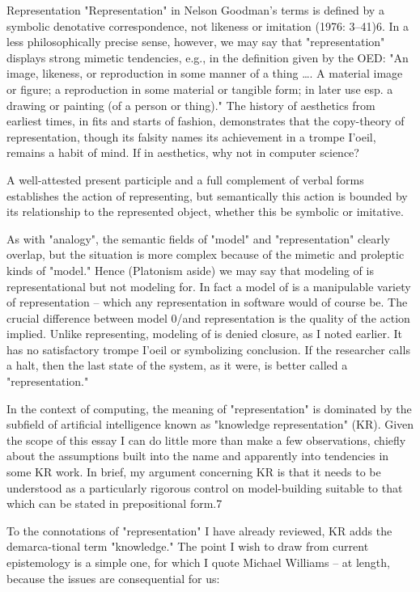 Representation
"Representation" in Nelson Goodman's terms is defined by a symbolic denotative correspondence, not likeness or imitation (1976: 3–41)6. In a less philosophically precise sense, however, we may say that "representation" displays strong mimetic tendencies, e.g., in the definition given by the OED: "An image, likeness, or reproduction in some manner of a thing …. A material image or figure; a reproduction in some material or tangible form; in later use esp. a drawing or painting (of a person or thing)." The history of aesthetics from earliest times, in fits and starts of fashion, demonstrates that the copy-theory of representation, though its falsity names its achievement in a trompe I'oeil, remains a habit of mind. If in aesthetics, why not in computer science?

A well-attested present participle and a full complement of verbal forms establishes the action of representing, but semantically this action is bounded by its relationship to the represented object, whether this be symbolic or imitative.

As with "analogy", the semantic fields of "model" and "representation" clearly overlap, but the situation is more complex because of the mimetic and proleptic kinds of "model." Hence (Platonism aside) we may say that modeling of is representational but not modeling for. In fact a model of is a manipulable variety of representation – which any representation in software would of course be. The crucial difference between model 0/and representation is the quality of the action implied. Unlike representing, modeling of is denied closure, as I noted earlier. It has no satisfactory trompe I'oeil or symbolizing conclusion. If the researcher calls a halt, then the last state of the system, as it were, is better called a "representation."

In the context of computing, the meaning of "representation" is dominated by the subfield of artificial intelligence known as "knowledge representation" (KR). Given the scope of this essay I can do little more than make a few observations, chiefly about the assumptions built into the name and apparently into tendencies in some KR work. In brief, my argument concerning KR is that it needs to be understood as a particularly rigorous control on model-building suitable to that which can be stated in prepositional form.7

To the connotations of "representation" I have already reviewed, KR adds the demarca-tional term "knowledge." The point I wish to draw from current epistemology is a simple one, for which I quote Michael Williams – at length, because the issues are consequential for us:

